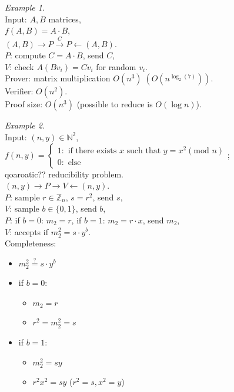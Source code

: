 \documentclass[a4paper, 12pt]{book}
\theoremstyle{definition}
\theoremstyle{remark}
\newtheorem*{ex}{Example}
\newcommand{\N}{\mathbb{N}}
\newcommand{\Z}{\mathbb{Z}}
\begin{document}
\begin{ex} \text{} \\
  Input: $A, B$ matrices, \\
  $f(A, B) = A \cdot B$, \\
  $(A, B) \to P \stackrel{C}{\to} P \leftarrow (A, B)$. \\
  $P$: compute $C = A \cdot B$, send $C$, \\
  $V$: check $A (B v_i) = C v_i$ for random $v_i$. \\
  Prover: matrix multiplication $O(n^3) \; (O(n^{\log_2(7)}))$. \\
  Verifier: $O(n^2)$. \\
  Proof size: $O(n^3)$ (possible to reduce is $O(\log n)$).
\end{ex}
\begin{ex} \text{} \\
  Input: $(n, y) \in \N^2$, \\
  $f(n, y) = \begin{cases}
    1: \text{ if there exists $x$ such that } y = x^2 (\text{mod } n) \\
    0: \text{ else}
  \end{cases}$; \\
  qoaroatic?? reducibility problem. \\
  $(n, y) \to P \to V \leftarrow (n, y)$. \\
  $P$: sample $r \in \Z_n$, $s = r^2$, send $s$, \\
  $V$: sample $b \in \{0, 1\}$, send $b$, \\
  $P$: if $b = 0$: $m_2 = r$, if $b = 1$: $m_2 = r \cdot x$, send $m_2$, \\
  $V$: accepts if $m_2^2 = s \cdot y^b$. \\
  Completeness:
  \begin{itemize}[label={}]
    \item $m_2^2 \stackrel{?}{=} s \cdot y^b$
    \item if $b = 0:$
    \begin{itemize}[label={}]
      \item $m_2 = r$
      \item $r^2 = m_2^2 = s$ \checkmark
    \end{itemize}
    \item if $b = 1:$
    \begin{itemize}[label={}]
      \item $m_2^2 = s y$ 
      \item $r^2 x^2 = s y$ \checkmark ($r^2 = s, x^2 = y$)

\end{itemize}
\end{itemize}
\end{ex}
\end{document}
